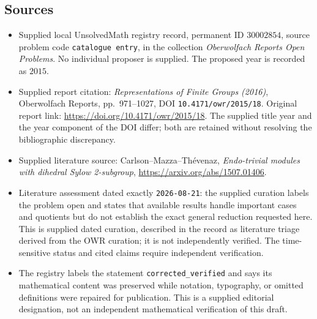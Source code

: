 \documentclass[11pt]{article}
\begin{document}
\subsection{Sources}
\begin{itemize}
\item Supplied local UnsolvedMath registry record, permanent ID \(30002854\), source problem code \texttt{catalogue entry}, in the collection \emph{Oberwolfach Reports Open Problems}. No individual proposer is supplied. The proposed year is recorded as \(2015\).
\item Supplied report citation: \emph{Representations of Finite Groups (2016)}, Oberwolfach Reports, pp.\ 971--1027, DOI \texttt{10.4171/owr/2015/18}. Original report link: \url{https://doi.org/10.4171/owr/2015/18}. The supplied title year and the year component of the DOI differ; both are retained without resolving the bibliographic discrepancy.
\item Supplied literature source: Carlson--Mazza--Th\'evenaz, \emph{Endo-trivial modules with dihedral Sylow 2-subgroup}, \url{https://arxiv.org/abs/1507.01406}.
\item Literature assessment dated exactly \texttt{2026-08-21}: the supplied curation labels the problem open and states that available results handle important cases and quotients but do not establish the exact general reduction requested here. This is supplied dated curation, described in the record as literature triage derived from the OWR curation; it is not independently verified. The time-sensitive status and cited claims require independent verification.
\item The registry labels the statement \texttt{corrected\_verified} and says its mathematical content was preserved while notation, typography, or omitted definitions were repaired for publication. This is a supplied editorial designation, not an independent mathematical verification of this draft.
\end{itemize}
\end{document}
